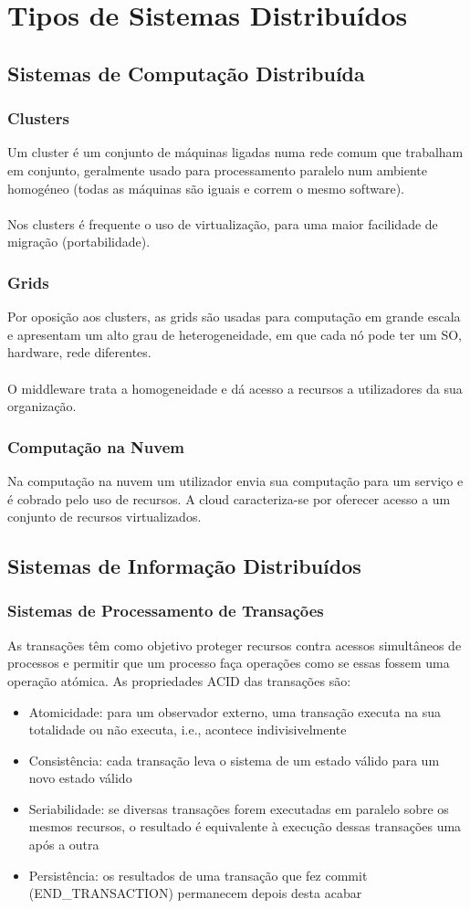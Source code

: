 \documentclass[10pt,a4paper]{report}
\begin{document}
\section{Tipos de Sistemas Distribuídos}
\subsection{Sistemas de Computação Distribuída}
\subsubsection{Clusters}
Um cluster é um conjunto de máquinas ligadas numa rede comum que trabalham em conjunto, geralmente usado para processamento paralelo num ambiente homogéneo (todas as máquinas são iguais e correm o mesmo software).\\
\\
Nos clusters é frequente o uso de virtualização, para uma maior facilidade de migração (portabilidade).
\subsubsection{Grids}
Por oposição aos clusters, as grids são usadas para computação em grande escala e apresentam um alto grau de heterogeneidade, em que cada nó pode ter um SO, hardware, rede diferentes.\\
\\
O middleware trata a homogeneidade e dá acesso a recursos a utilizadores da sua organização.
\subsubsection{Computação na Nuvem}
Na computação na nuvem um utilizador envia sua computação para um serviço e é cobrado pelo uso de recursos. A cloud caracteriza-se por oferecer acesso a um
conjunto de recursos virtualizados.
\subsection{Sistemas de Informação Distribuídos}
\subsubsection{Sistemas de Processamento de Transações}
As transações têm como objetivo proteger recursos contra acessos simultâneos de processos e permitir que um processo faça operações como se essas fossem uma operação atómica. As propriedades ACID das transações são:
\begin{itemize}
\item Atomicidade: para um observador externo, uma transação executa na sua totalidade ou não executa, i.e., acontece indivisivelmente
\item Consistência: cada transação leva o sistema de um estado válido para um novo estado válido
\item Seriabilidade:  se diversas transações forem executadas em paralelo sobre os mesmos recursos, o resultado é equivalente à execução dessas transações uma após a outra
\item Persistência: os resultados de uma transação que fez commit (END\_TRANSACTION) permanecem depois desta acabar
\end{itemize}
\end{document}
